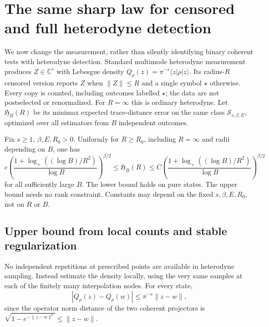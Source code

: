 \section{The same sharp law for censored and full heterodyne detection}
\label{sec:heterodyne-aperture}
We now change the measurement, rather than silently identifying binary
coherent tests with heterodyne detection. Standard multimode heterodyne
measurement produces $Z\in\mathbb C^s$ with Lebesgue density
$Q_\rho(z)=\pi^{-s}\langle z|\rho|z\rangle$. Its radius-$R$ censored version
reports $Z$ when $\|Z\|\le R$ and a single symbol $\star$ otherwise. Every
copy is counted, including outcomes labelled $\star$; the data are not
postselected or renormalized. For $R=\infty$ this is ordinary heterodyne.
Let $\mathfrak H_B(R)$ be its minimax expected trace-distance error on the
same class $\mathcal S_{s,\beta,E}$, optimized over all estimators from $B$
independent outcomes.

\begin{theorem}
\label{thm:heterodyne-minimax}
Fix $s\ge1$, $\beta,E,R_0>0$. Uniformly for $R\ge R_0$, including
$R=\infty$ and radii depending on $B$, one has
\[
 \boxed{
 c\left(\frac{1+\log_+((\log B)/R^2)}{\log B}\right)^{\beta/2}
 \le\mathfrak H_B(R)\le
 C\left(\frac{1+\log_+((\log B)/R^2)}{\log B}\right)^{\beta/2}}
 \tag{B.1}\label{eq:heterodyne-minimax}
\]
for all sufficiently large $B$. The lower bound holds on pure states. The
upper bound needs no rank constraint. Constants may depend on the fixed
$s,\beta,E,R_0$, not on $R$ or $B$.
\end{theorem}

\subsection{Upper bound from local counts and stable regularization}
No independent repetitions at prescribed points are available in heterodyne
sampling. Instead estimate the density locally, using the very same samples
at each of the finitely many interpolation nodes. For every state,
\[
 |Q_\rho(z)-Q_\rho(w)|\le\pi^{-s}\|z-w\|,
 \tag{B.2}\label{eq:heterodyne-lipschitz}
\]
since the operator norm distance of the two coherent projectors is
$\sqrt{1-e^{-\|z-w\|^2}}\le\|z-w\|$.

